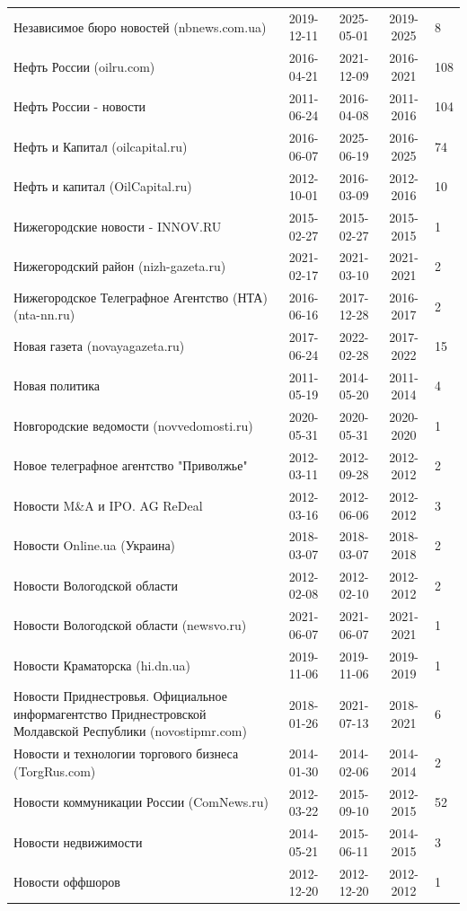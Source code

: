 \begin{longtable}{p{6cm}cccp{2cm}}
Независимое бюро новостей (nbnews.com.ua) & 2019-12-11 & 2025-05-01 & 2019-2025 & 8\\
Нефть России (oilru.com) & 2016-04-21 & 2021-12-09 & 2016-2021 & 108\\
Нефть России - новости & 2011-06-24 & 2016-04-08 & 2011-2016 & 104\\
Нефть и Капитал (oilcapital.ru) & 2016-06-07 & 2025-06-19 & 2016-2025 & 74\\
Нефть и капитал (OilCapital.ru) & 2012-10-01 & 2016-03-09 & 2012-2016 & 10\\
Нижегородские новости - INNOV.RU & 2015-02-27 & 2015-02-27 & 2015-2015 & 1\\
Нижегородский район (nizh-gazeta.ru) & 2021-02-17 & 2021-03-10 & 2021-2021 & 2\\
Нижегородское Телеграфное Агентство (НТА) (nta-nn.ru) & 2016-06-16 & 2017-12-28 & 2016-2017 & 2\\
Новая газета (novayagazeta.ru) & 2017-06-24 & 2022-02-28 & 2017-2022 & 15\\
Новая политика & 2011-05-19 & 2014-05-20 & 2011-2014 & 4\\
Новгородские ведомости (novvedomosti.ru) & 2020-05-31 & 2020-05-31 & 2020-2020 & 1\\
Новое телеграфное агентство "Приволжье" & 2012-03-11 & 2012-09-28 & 2012-2012 & 2\\
Новости M\&A и IPO. AG ReDeal & 2012-03-16 & 2012-06-06 & 2012-2012 & 3\\
Новости Online.ua (Украина) & 2018-03-07 & 2018-03-07 & 2018-2018 & 2\\
Новости Вологодской области & 2012-02-08 & 2012-02-10 & 2012-2012 & 2\\
Новости Вологодской области (newsvo.ru) & 2021-06-07 & 2021-06-07 & 2021-2021 & 1\\
Новости Краматорска (hi.dn.ua) & 2019-11-06 & 2019-11-06 & 2019-2019 & 1\\
Новости Приднестровья. Официальное информагентство Приднестровской Молдавской Республики (novostipmr.com) & 2018-01-26 & 2021-07-13 & 2018-2021 & 6\\
Новости и технологии торгового бизнеса (TorgRus.com) & 2014-01-30 & 2014-02-06 & 2014-2014 & 2\\
Новости коммуникации России (ComNews.ru) & 2012-03-22 & 2015-09-10 & 2012-2015 & 52\\
Новости недвижимости & 2014-05-21 & 2015-06-11 & 2014-2015 & 3\\
Новости оффшоров & 2012-12-20 & 2012-12-20 & 2012-2012 & 1\\

\end{longtable}
